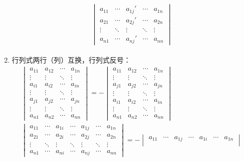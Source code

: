 \begin{property}
\begin{enumerate}
\begin{gather*}
\begin{aligned}
				\begin{vmatrix}
					a_{11} & \cdots & a_{1j}' & \cdots & a_{1n} \\
					a_{21} & \cdots & a_{2j}' & \cdots & a_{2n} \\
					\vdots & \ddots & \vdots & \ddots & \vdots \\
					a_{n1} & \cdots & a_{nj}' & \cdots & a_{nn}
				\end{vmatrix}
			\end{aligned}
		\end{gather*}
		\item 行列式两行（列）互换，行列式反号：
		\begin{gather*}
			\begin{vmatrix}
				a_{11} & a_{12} & \cdots & a_{1n} \\
				\vdots & \vdots & \ddots & \vdots \\
				a_{i1} & a_{i2} & \cdots & a_{in} \\
				\vdots & \vdots & \ddots & \vdots \\
				a_{j1} & a_{j2} & \cdots & a_{jn} \\
				\vdots & \vdots & \ddots & \vdots \\
				a_{n1} & a_{n2} & \cdots & a_{nn}
			\end{vmatrix}=-
			\begin{vmatrix}
				a_{11} & a_{12} & \cdots & a_{1n} \\
				\vdots & \vdots & \ddots & \vdots \\
				a_{j1} & a_{j2} & \cdots & a_{jn} \\
				\vdots & \vdots & \ddots & \vdots \\
				a_{i1} & a_{i2} & \cdots & a_{in} \\
				\vdots & \vdots & \ddots & \vdots \\
				a_{n1} & a_{n2} & \cdots & a_{nn}
			\end{vmatrix} \\
			\begin{vmatrix}
				a_{11} & \cdots & a_{1i} & \cdots & a_{1j} & \cdots & a_{1n} \\
				a_{21} & \cdots & a_{2i} & \cdots & a_{2j} & \cdots & a_{2n} \\
				\vdots & \ddots & \vdots & \ddots & \vdots & \ddots & \vdots \\
				a_{n1} & \cdots & a_{ni} & \cdots & a_{nj} & \cdots & a_{nn}
			\end{vmatrix}=-
			\begin{vmatrix}
				a_{11} & \cdots & a_{1j} & \cdots & a_{1i} & \cdots & a_{1n} \\

\end{vmatrix}
\end{gather*}
\end{enumerate}
\end{property}
